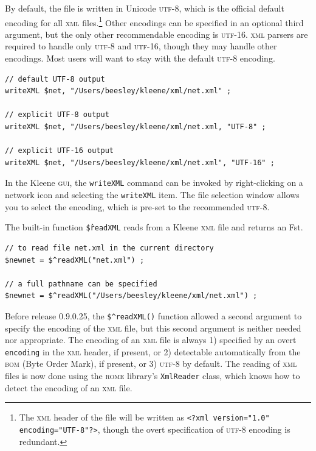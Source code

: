 \documentclass[letterpaper,12pt]{article}
\newcommand{\acro}{\textsc}
\begin{document}
By default, the file is written in Unicode \acro{utf-8}, which is the
official default encoding for all \acro{xml} files.\footnote{The
\acro{xml} header of the file will be written as \texttt{<?xml
version="1.0" encoding="UTF-8"?>}, though the overt specification of
\acro{utf-8} encoding is redundant.}  Other encodings can be specified in
an optional third argument, but the only other recommendable encoding is
\acro{utf-16}.  \acro{xml} parsers are required to handle only
\acro{utf-8} and \acro{utf-16}, though they may handle other encodings.
Most users will want to stay with the default \acro{utf-8} encoding.

\begin{Verbatim}[fontsize=\small]
// default UTF-8 output
writeXML $net, "/Users/beesley/kleene/xml/net.xml" ;

// explicit UTF-8 output
writeXML $net, "/Users/beesley/kleene/xml/net.xml, "UTF-8" ;

// explicit UTF-16 output
writeXML $net, "/Users/beesley/kleene/xml/net.xml", "UTF-16" ;
\end{Verbatim}

In the Kleene \acro{gui}, the \verb!writeXML! command can be invoked by
right-clicking on a network icon and selecting the \verb!writeXML!
item.  The file selection window allows you to select the encoding,
which is pre-set to the recommended \acro{utf-8}.

The built-in function \texttt{\$\^readXML} reads from a Kleene \acro{xml} file and returns an Fst.

\begin{Verbatim}[fontsize=\small]
// to read file net.xml in the current directory
$newnet = $^readXML("net.xml") ;

// a full pathname can be specified
$newnet = $^readXML("/Users/beesley/kleene/xml/net.xml") ;
\end{Verbatim}

Before release 0.9.0.25, the \verb!$^readXML()! function allowed a second
argument to specify the encoding of the \acro{xml} file, but this second
argument is neither needed nor appropriate. The encoding of an
\acro{xml} file is always 1) specified by an overt \texttt{encoding} in
the \acro{xml} header, if present, or 2) detectable automatically from the
\acro{bom} (Byte Order Mark), if present, or 3) \acro{utf-8} by default.
The reading of \acro{xml} files is now done using the \acro{rome} library's
\texttt{XmlReader} class, which knows how to detect the encoding of an
\acro{xml} file.
\end{document}
